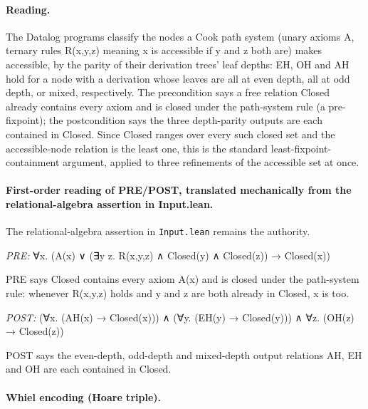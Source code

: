 \documentclass[10pt]{article}
\begin{document}
\paragraph{Reading.} The Datalog programs classify the nodes a Cook path system (unary axioms A, ternary rules R(x,y,z) meaning x is accessible if y and z both are) makes accessible, by the parity of their derivation trees' leaf depths: EH, OH and AH hold for a node with a derivation whose leaves are all at even depth, all at odd depth, or mixed, respectively. The precondition says a free relation Closed already contains every axiom and is closed under the path-system rule (a pre-fixpoint); the postcondition says the three depth-parity outputs are each contained in Closed. Since Closed ranges over every such closed set and the accessible-node relation is the least one, this is the standard least-fixpoint-containment argument, applied to three refinements of the accessible set at once.

\paragraph{First-order reading of PRE/POST, translated mechanically from the relational-algebra assertion in Input.lean.} The relational-algebra assertion in \texttt{Input.lean} remains the authority.

\textit{PRE:} ∀x. (A(x) ∨ (∃y z. R(x,y,z) ∧ Closed(y) ∧ Closed(z)) → Closed(x))\par PRE says Closed contains every axiom A(x) and is closed under the path-system rule: whenever R(x,y,z) holds and y and z are both already in Closed, x is too.

\textit{POST:} (∀x. (AH(x) → Closed(x))) ∧ (∀y. (EH(y) → Closed(y))) ∧ ∀z. (OH(z) → Closed(z))\par POST says the even-depth, odd-depth and mixed-depth output relations AH, EH and OH are each contained in Closed.

\paragraph{Whiel encoding (Hoare triple).}
\end{document}
